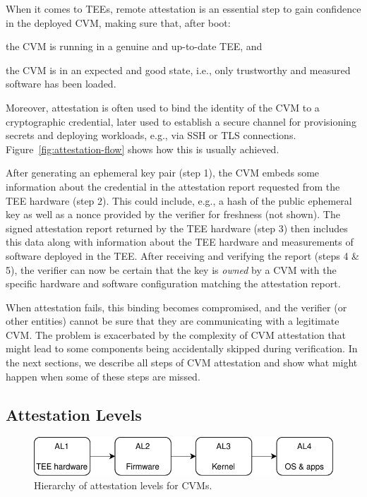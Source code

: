 When it comes to \acp{TEE}, remote attestation is an essential step to gain
confidence in the deployed \ac{CVM}, making sure that, after boot:
\begin{inparaenum}
    \item the \ac{CVM} is running in a genuine and up-to-date \ac{TEE}, and
    \item the \ac{CVM} is in an expected and good state, i.e., only trustworthy
      and measured software has been loaded.
\end{inparaenum}
Moreover, attestation is often used to bind the identity of the \ac{CVM} to a
cryptographic credential, later used to establish a secure channel for
provisioning secrets and deploying workloads, e.g., via SSH or TLS connections.
Figure~\ref{fig:attestation-flow} shows how this is usually achieved.

After generating an ephemeral key pair (step 1), the \ac{CVM} embeds some
information about the credential in the attestation report requested from the
TEE hardware (step 2). This could include, e.g., a hash of the public ephemeral
key as well as a nonce provided by the verifier for freshness (not shown). The
signed attestation report returned by the TEE hardware (step 3) then includes
this data along with information about the TEE hardware and measurements of
software deployed in the TEE. After receiving and verifying the report (steps 4
\& 5), the verifier can now be certain that the key is \emph{owned} by a
\ac{CVM} with the specific hardware and software configuration matching the
attestation report.

When attestation fails, this binding becomes compromised, and the verifier (or
other entities) cannot be sure that they are communicating with a legitimate
\ac{CVM}. The problem is exacerbated by the complexity of \ac{CVM} attestation
that might lead to some components being accidentally skipped during
verification. In the next sections, we describe all steps of \ac{CVM}
attestation and show what might happen when some of these steps are missed.

\subsection{Attestation Levels}
\label{section:att-levels}

\begin{figure}[t]
    \centering
      \includegraphics[width=.9\columnwidth]{figures/levels-v2.drawio.pdf}
    \caption{Hierarchy of attestation levels for \acp{CVM}.}
    \label{fig:attestation-levels}
\end{figure}

